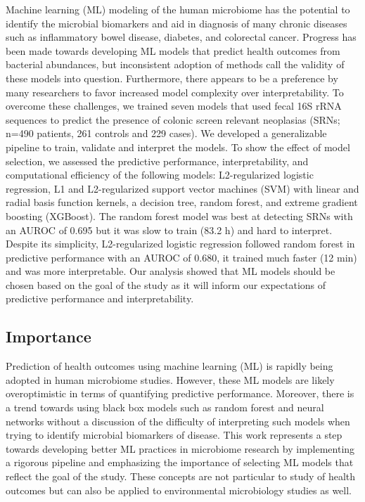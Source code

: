\documentclass[11pt,]{article}
\begin{document}
Machine learning (ML) modeling of the human microbiome has the potential
to identify the microbial biomarkers and aid in diagnosis of many
chronic diseases such as inflammatory bowel disease, diabetes, and
colorectal cancer. Progress has been made towards developing ML models
that predict health outcomes from bacterial abundances, but inconsistent
adoption of methods call the validity of these models into question.
Furthermore, there appears to be a preference by many researchers to
favor increased model complexity over interpretability. To overcome
these challenges, we trained seven models that used fecal 16S rRNA
sequences to predict the presence of colonic screen relevant neoplasias
(SRNs; n=490 patients, 261 controls and 229 cases). We developed a
generalizable pipeline to train, validate and interpret the models. To
show the effect of model selection, we assessed the predictive
performance, interpretability, and computational efficiency of the
following models: L2-regularized logistic regression, L1 and
L2-regularized support vector machines (SVM) with linear and radial
basis function kernels, a decision tree, random forest, and extreme
gradient boosting (XGBoost). The random forest model was best at
detecting SRNs with an AUROC of 0.695 but it was slow to train (83.2 h)
and hard to interpret. Despite its simplicity, L2-regularized logistic
regression followed random forest in predictive performance with an
AUROC of 0.680, it trained much faster (12 min) and was more
interpretable. Our analysis showed that ML models should be chosen based
on the goal of the study as it will inform our expectations of
predictive performance and interpretability.

\newpage

\subsection{Importance}\label{importance}

Prediction of health outcomes using machine learning (ML) is rapidly
being adopted in human microbiome studies. However, these ML models are
likely overoptimistic in terms of quantifying predictive performance.
Moreover, there is a trend towards using black box models such as random
forest and neural networks without a discussion of the difficulty of
interpreting such models when trying to identify microbial biomarkers of
disease. This work represents a step towards developing better ML
practices in microbiome research by implementing a rigorous pipeline and
emphasizing the importance of selecting ML models that reflect the goal
of the study. These concepts are not particular to study of health
outcomes but can also be applied to environmental microbiology studies
as well.
\end{document}
